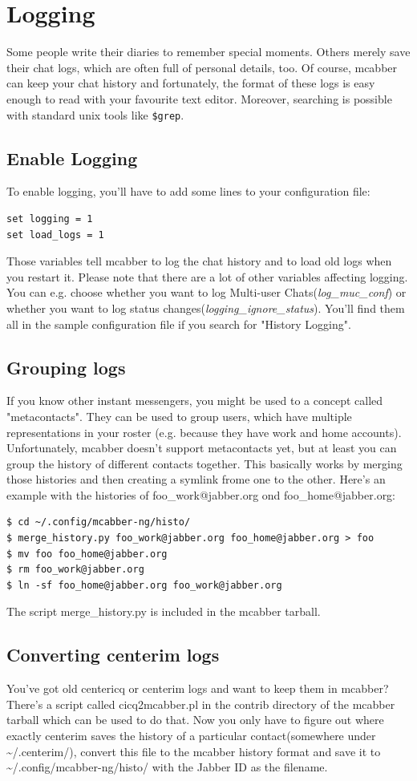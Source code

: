 \documentclass[12pt,oneside,a4]{book}
\begin{document}
\chapter{Logging}
Some people write their diaries to remember special moments. Others merely save their chat logs,
which are often full of personal details, too. Of course, mcabber can keep your chat history
and fortunately, the format of these logs is easy enough to read with your
favourite text editor. Moreover, searching is possible with standard unix tools like \verb+$grep+.
\section{Enable Logging}
To enable logging, you'll have to add some lines to your configuration file:
\begin{lstlisting}
set logging = 1
set load_logs = 1
\end{lstlisting}
Those variables tell mcabber to log the chat history and to load old logs when you restart it.
Please note that there are a lot of other variables affecting logging. You can e.g. choose whether
you want to log Multi-user Chats(\textit{log\_muc\_conf}) or whether you want to log status changes(\textit{logging\_ignore\_status}).
You'll find them all in the sample configuration file\cite{samplerc} if you search for "History Logging".
\section{Grouping logs}
If you know other instant messengers, you might be used to a concept called "metacontacts".
They can be used to group users, which have multiple representations in your
roster (e.g. because they have work and home accounts). Unfortunately, mcabber doesn't support
metacontacts yet, but at least you can group the history of different contacts together.
This basically works by merging those histories and then creating a symlink frome one to the other.
Here's an example with the histories of foo\_work@jabber.org ond foo\_home@jabber.org:
\begin{lstlisting}
$ cd ~/.config/mcabber-ng/histo/
$ merge_history.py foo_work@jabber.org foo_home@jabber.org > foo
$ mv foo foo_home@jabber.org
$ rm foo_work@jabber.org
$ ln -sf foo_home@jabber.org foo_work@jabber.org
\end{lstlisting}
The script merge\_history.py is included in the mcabber tarball.
\section{Converting centerim logs}
You've got old centericq\cite{centericq} or centerim\cite{centerim} logs and want to keep
them in mcabber? There's a script called cicq2mcabber.pl in the contrib directory of the mcabber
tarball which can be used to do that. Now you only have to figure out where exactly
centerim saves the history of a particular contact(somewhere under \~{}/.centerim/),
convert this file to the mcabber history format and save it to \~{}/.config/mcabber-ng/histo/ with the
Jabber ID as the filename.
\end{document}
